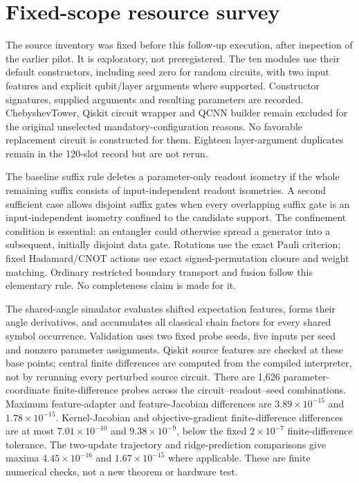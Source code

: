 \section{Fixed-scope resource survey}
\label{app:survey}
The source inventory was fixed before this follow-up execution, after
inspection of the earlier pilot. It is exploratory, not preregistered.
The ten modules use their default constructors, including seed zero
for random circuits, with two input features and explicit qubit/layer
arguments where supported. Constructor signatures, supplied arguments
and resulting parameters are recorded. ChebyshevTower, Qiskit circuit
wrapper and QCNN builder remain excluded for the original unselected
mandatory-configuration reasons. No favorable replacement circuit is
constructed for them. Eighteen layer-argument duplicates remain in
the 120-slot record but are not rerun.

The baseline suffix rule deletes a parameter-only readout isometry if
the whole remaining suffix consists of input-independent readout
isometries. A second sufficient case allows disjoint suffix gates when
every overlapping suffix gate is an input-independent isometry confined
to the candidate support. The confinement condition is essential:
an entangler could otherwise spread a generator into a subsequent,
initially disjoint data gate. Rotations use the exact Pauli criterion;
fixed Hadamard/CNOT actions use exact signed-permutation closure and
weight matching. Ordinary restricted boundary transport and fusion
follow this elementary rule. No completeness claim is made for it.

The shared-angle simulator evaluates shifted expectation features,
forms their angle derivatives, and accumulates all classical chain
factors for every shared symbol occurrence. Validation uses two fixed
probe seeds, five inputs per seed and nonzero parameter assignments.
Qiskit source features are checked at these base points; central finite
differences are computed from the compiled interpreter, not by rerunning
every perturbed source circuit. There are 1,626 parameter-coordinate
finite-difference probes across the circuit--readout--seed combinations.
Maximum feature-adapter and feature-Jacobian differences are
$3.89\times10^{-15}$ and $1.78\times10^{-15}$.
Kernel-Jacobian and objective-gradient finite-difference differences
are at most $7.01\times10^{-10}$ and $9.38\times10^{-9}$,
below the fixed $2\times10^{-7}$ finite-difference tolerance.
The two-update trajectory and ridge-prediction comparisons give maxima
$4.45\times10^{-16}$ and $1.67\times10^{-15}$ where applicable.
These are finite numerical checks, not a new theorem or hardware test.

